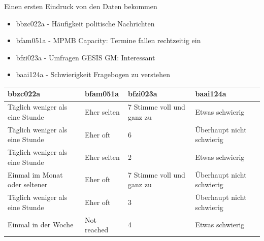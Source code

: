 \documentclass[ignorenonframetext,]{beamer}
\providecommand{\tightlist}{%
  \setlength{\itemsep}{0pt}\setlength{\parskip}{0pt}}
\begin{document}
\begin{frame}{Einen ersten Eindruck von den Daten bekommen}

\begin{itemize}
\tightlist
\item
  bbzc022a - Häufigkeit politische Nachrichten
\item
  bfam051a - MPMB Capacity: Termine fallen rechtzeitig ein
\item
  bfzi023a - Umfragen GESIS GM: Interessant
\item
  baai124a - Schwierigkeit Fragebogen zu verstehen
\end{itemize}

\begin{tabular}{l|l|l|l}
\hline
bbzc022a & bfam051a & bfzi023a & baai124a\\
\hline
Täglich weniger als eine Stunde & Eher selten & 7 Stimme voll und ganz zu & Etwas schwierig\\
\hline
Täglich weniger als eine Stunde & Eher oft & 6 & Überhaupt nicht schwierig\\
\hline
Täglich weniger als eine Stunde & Eher selten & 2 & Etwas schwierig\\
\hline
Einmal im Monat oder seltener & Eher oft & 7 Stimme voll und ganz zu & Überhaupt nicht schwierig\\
\hline
Täglich weniger als eine Stunde & Eher oft & 3 & Überhaupt nicht schwierig\\
\hline
Einmal in der Woche & Not reached & 4 & Etwas schwierig\\
\hline
\end{tabular}

\end{frame}
\end{document}
